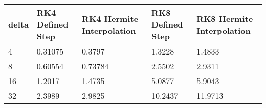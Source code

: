 \begin{tabular}{lllll}
delta & RK4 Defined Step & RK4 Hermite Interpolation & RK8 Defined Step & RK8 Hermite Interpolation \\ 
\hline 
4 & 0.31075 & 0.3797 & 1.3228 & 1.4833 \\ 
8 & 0.60554 & 0.73784 & 2.5502 & 2.9311 \\ 
16 & 1.2017 & 1.4735 & 5.0877 & 5.9043 \\ 
32 & 2.3989 & 2.9825 & 10.2437 & 11.9713 \\ 
\hline 
\end{tabular}
